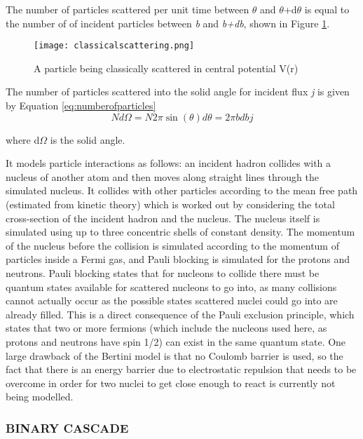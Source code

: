 \documentclass[11pt,oneside,a4paper]{article}
\begin{document}
The number of particles scattered per unit time between $\theta$ and $\theta$+d$\theta$ is equal to the number of of incident particles between \textit{b} and \textit{b+db}, shown in Figure \ref{fig:classicalscattering}.

\begin{figure}[htbp]
	\centering
	\texttt{[image: classicalscattering.png]}
	\caption{A particle being classically scattered in central potential V(r)}
	\label{fig:classicalscattering}
\end{figure}

The number of particles scattered into the solid angle for incident flux \textit{j} is given by Equation \ref{eq:numberofparticles}
\begin{equation}
\label{eq:numberofparticles}
N d \Omega = N 2\pi \sin (\theta) d\theta = 2 \pi b db j 
\end{equation}

where d$\Omega$ is the solid angle.
 


It models particle interactions as follows: an incident hadron collides with a nucleus of another atom and then moves along straight lines through the simulated nucleus. It collides with other particles according to the mean free path (estimated from kinetic theory) which is worked out by considering the total cross-section of the incident hadron and the nucleus. The nucleus itself is simulated using up to three concentric shells of constant density. The momentum of the nucleus before the collision is simulated according to the momentum of particles inside a Fermi gas, and Pauli blocking is simulated for the protons and neutrons. Pauli blocking states that for nucleons to collide there must be quantum states available for scattered nucleons to go into, as many collisions cannot actually occur as the possible states scattered nuclei could go into are already filled. This is a direct consequence of the Pauli exclusion principle, which states that two or more fermions (which include the nucleons used here, as protons and neutrons have spin 1/2) can exist in the same quantum state. One large drawback of the Bertini model is that no Coulomb barrier is used, so the fact that there is an energy barrier due to electrostatic repulsion that needs to be overcome in order for two nuclei to get close enough to react is currently not being modelled. 


\subsubsection{BINARY CASCADE}
\end{document}
